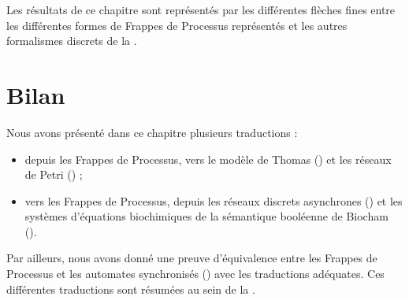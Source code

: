 Les résultats de ce chapitre sont représentés par les différentes flèches fines
entre les différentes formes de Frappes de Processus représentés 
et les autres formalismes discrets de la .















% 


\section{Bilan}
Nous avons présenté dans ce chapitre plusieurs traductions :
\begin{itemize}
  \item depuis les Frappes de Processus,
    vers le modèle de Thomas ()
    et les réseaux de Petri () ;
  \item vers les Frappes de Processus,
    depuis les réseaux discrets asynchrones ()
    et les systèmes d'équations biochimiques de la sémantique booléenne de Biocham
    ().
\end{itemize}
Par ailleurs, nous avons donné une preuve d'équivalence entre les Frappes de Processus
et les automates synchronisés () avec les traductions adéquates.
Ces différentes traductions sont résumées au sein de la .

